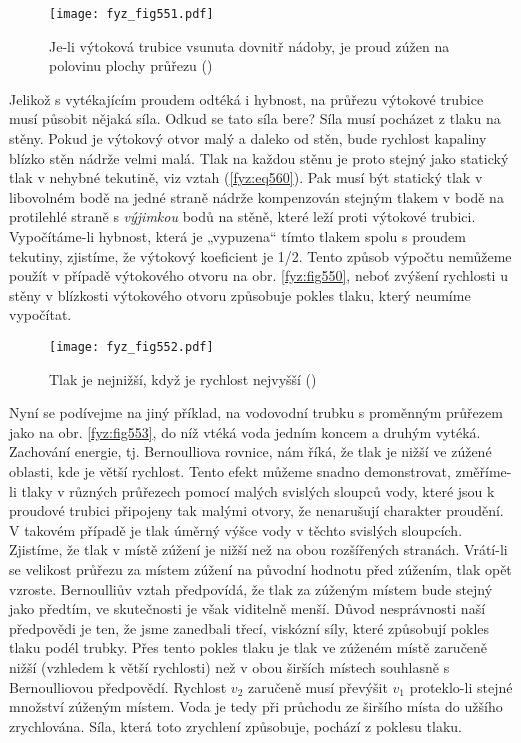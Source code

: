     \begin{figure}[ht!] %
      \centering
      \texttt{[image: fyz\_fig551.pdf]}
      \caption{Je-li výtoková trubice vsunuta dovnitř nádoby, je proud zúžen na polovinu plochy 
               průřezu
               (\cite[s.~750]{Feynman02})}
      \label{fyz:fig551}
    \end{figure}
    
    Jelikož s vytékajícím proudem odtéká i hybnost, na průřezu výtokové trubice musí působit nějaká 
    síla. Odkud se tato síla bere? Síla musí pocházet z tlaku na stěny. Pokud je výtokový otvor 
    malý a daleko od stěn, bude rychlost kapaliny blízko stěn nádrže velmi malá. Tlak na každou 
    stěnu je proto stejný jako statický tlak v nehybné tekutině, viz vztah (\ref{fyz:eq560}). Pak 
    musí být statický tlak v libovolném bodě na jedné straně nádrže kompenzován stejným tlakem v 
    bodě na protilehlé straně s \emph{výjimkou} bodů na stěně, které leží proti výtokové trubici. 
    Vypočítáme-li hybnost, která je „vypuzena“ tímto tlakem spolu s proudem tekutiny, zjistíme, že 
    výtokový koeficient je \num{1/2}. Tento způsob výpočtu nemůžeme použít v případě výtokového 
    otvoru na obr. \ref{fyz:fig550}, neboť zvýšení rychlosti u stěny v blízkosti výtokového otvoru 
    způsobuje pokles tlaku, který neumíme vypočítat.

    \begin{figure}[ht!] %
      \centering
      \texttt{[image: fyz\_fig552.pdf]}
      \caption{Tlak je nejnižší, když je rychlost nejvyšší
               (\cite[s.~751]{Feynman02})}
      \label{fyz:fig552}
    \end{figure}
    
    Nyní se podívejme na jiný příklad, na vodovodní trubku s proměnným průřezem jako na obr. 
    \ref{fyz:fig553}, do níž vtéká voda jedním koncem a druhým vytéká. Zachování energie, tj. 
    Bernoulliova rovnice, nám říká, že tlak je nižší ve zúžené oblasti, kde je větší rychlost. 
    Tento efekt můžeme snadno demonstrovat, změříme-li tlaky v různých průřezech pomocí malých 
    svislých sloupců vody, které jsou k proudové trubici připojeny tak malými otvory, že nenarušují 
    charakter proudění. V takovém případě je tlak úměrný výšce vody v těchto svislých sloupcích. 
    Zjistíme, že tlak v místě zúžení je nižší než na obou rozšířených stranách. Vrátí-li se 
    velikost průřezu za místem zúžení na původní hodnotu před zúžením, tlak opět vzroste. 
    Bernoulliův vztah předpovídá, že tlak za zúženým místem bude stejný jako předtím, ve 
    skutečnosti je však viditelně menší. Důvod nesprávnosti naší předpovědi je ten, že jsme 
    zanedbali třecí, viskózní síly, které způsobují pokles tlaku podél trubky. Přes tento pokles 
    tlaku je tlak ve zúženém místě zaručeně nižší (vzhledem k větší rychlosti) než v obou širších 
    místech souhlasně s Bernoulliovou předpovědí. Rychlost \(v_2\) zaručeně musí převýšit \(v_1\) 
    proteklo-li stejné množství zúženým místem. Voda je tedy při průchodu ze širšího místa do 
    užšího zrychlována. Síla, která toto zrychlení způsobuje, pochází z poklesu tlaku.
    
